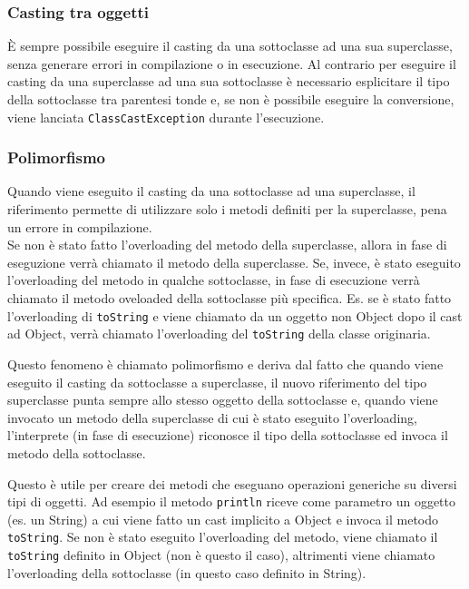 \documentclass{article}
\begin{document}
\subsubsection*{Casting tra oggetti}
È sempre possibile eseguire il casting da una sottoclasse ad una sua superclasse, senza generare errori in compilazione o in esecuzione.
Al contrario per eseguire il casting da una superclasse ad una sua sottoclasse è necessario esplicitare il tipo della sottoclasse tra
parentesi tonde e, se non è possibile eseguire la conversione, viene lanciata \verb|ClassCastException| durante l'esecuzione.

\newpage


\subsubsection*{Polimorfismo}
Quando viene eseguito il casting da una sottoclasse ad una superclasse, il  riferimento permette di utilizzare solo i metodi
definiti per la superclasse, pena un errore in compilazione. \\
Se non è stato fatto l'overloading del metodo della superclasse, allora in fase di eseguzione verrà chiamato il metodo della superclasse.
Se, invece, è stato eseguito l'overloading del metodo in qualche sottoclasse, in fase di esecuzione verrà chiamato il metodo oveloaded
della sottoclasse più specifica.
Es. se è stato fatto l'overloading di \verb|toString| e viene chiamato da un oggetto non Object dopo il cast ad Object, verrà chiamato
l'overloading del \verb|toString| della classe originaria.

Questo fenomeno è chiamato polimorfismo e deriva dal fatto che quando viene eseguito il casting da sottoclasse a superclasse, il nuovo
riferimento del tipo superclasse punta sempre allo stesso oggetto della sottoclasse e, quando viene invocato un metodo della superclasse
di cui è stato eseguito l'overloading, l'interprete (in fase di esecuzione) riconosce il tipo della sottoclasse ed invoca il metodo
della sottoclasse.

Questo è utile per creare dei metodi che eseguano operazioni generiche su diversi tipi di oggetti. Ad esempio il metodo \verb|println| riceve
come parametro un oggetto (es. un String) a cui viene fatto un cast implicito a Object e invoca il metodo \verb|toString|. Se non è stato eseguito
l'overloading del metodo, viene chiamato il \verb|toString| definito in Object (non è questo il caso), altrimenti viene chiamato l'overloading della
sottoclasse (in questo caso definito in String).
\end{document}
